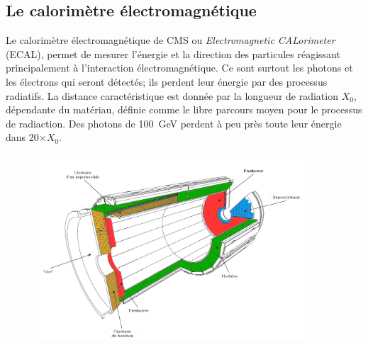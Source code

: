 \subsection{Le calorimètre électromagnétique}
Le calorimètre électromagnétique de CMS ou \textit{Electromagnetic CALorimeter} (ECAL), permet de mesurer l'énergie et la direction des particules réagissant principalement à l'interaction électromagnétique. Ce sont surtout les photons et les électrons qui seront détectés; ils perdent leur énergie par des processus radiatifs. La distance caractéristique est donnée par la longueur de radiation $X_{0}$, dépendante du matériau, définie comme le libre parcours moyen pour le processus de radiaction. Des photons de \SI{100}{\giga\eV} perdent à peu près toute leur énergie dans \num{20}$\times X_{0}$.
\begin{figure}[ht!]
	\centering
	\includegraphics[width=0.90\textwidth]{CMS/ECAL.png}
	\label{ECAL}
\end{figure}


